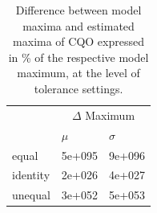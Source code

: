 			\makeatletter
			\setlength{\@fptop}{0pt}
			\makeatother
		
			\begin{table}[h!]
				
				\normalsize
				\caption{Difference between model maxima and estimated maxima of CQO expressed in \% of the respective model maximum, at the level of tolerance settings.}
				\centering
				
				\begin{tabular}{@{}lll@{}}
					\toprule	
					& \multicolumn{2}{c}{$\Delta$ Maximum} \\ \cmidrule{2-3}	
					& $\mu$   & $\sigma$   \\	
					\hline
					equal   & 5e+095 & 9e+096 \\
					identity    & 2e+026 & 4e+027 \\
					unequal    & 3e+052 & 5e+053 \\
					\toprule
				\end{tabular}
			
				\label{tab:cqosm6}
			
			\end{table}
	